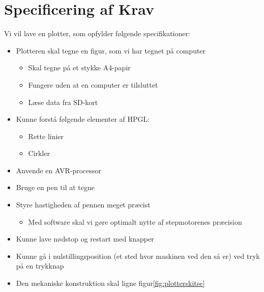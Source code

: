 \section{Specificering af Krav}

Vi vil lave en plotter, som opfylder følgende specifikationer:

\begin{itemize}
\item Plotteren skal tegne en figur, som vi har tegnet på computer
  \begin{itemize}
  \item Skal tegne på et stykke A4-papir
  \item Fungere uden at en computer er tilsluttet
  \item Læse data fra SD-kort
  \end{itemize}
\item Kunne forstå følgende elementer af HPGL:
  \begin{itemize}
  \item Rette linier
  \item Cirkler
  \end{itemize}
\item Anvende en AVR-processor
\item Bruge en pen til at tegne
\item Styre hastigheden af pennen meget præcist
  \begin{itemize}
  \item Med software skal vi gøre optimalt nytte af stepmotorenes præcision
  \end{itemize}
\item Kunne lave nødstop og restart med knapper
\item Kunne gå i nulstillingsposition (et sted hvor maskinen ved den
  så er) ved tryk på en trykknap
\item Den mekaniske konstruktion skal ligne figur\vref{fig:plotterskitse}
\end{itemize}
